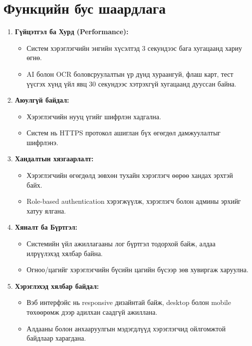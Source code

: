 \section{Функцийн бус шаардлага}
\begin{enumerate}
    \item \textbf{Гүйцэтгэл ба Хурд (Performance):} 
    \begin{itemize}
        \item Систем хэрэглэгчийн энгийн хүсэлтэд 3 секундээс бага хугацаанд хариу өгнө.
        \item AI болон OCR боловсруулалтын үр дүнд хураангуй, флаш карт, тест үүсгэх хүнд үйл явц 30 секундээс хэтрэхгүй хугацаанд дууссан байна.
    \end{itemize}  
    \item \textbf{Аюулгүй байдал:}
    \begin{itemize}
        \item Хэрэглэгчийн нууц үгийг шифрлэн хадгална.
        \item Систем нь HTTPS протокол ашиглан бүх өгөгдөл дамжуулалтыг шифрлэнэ.
    \end{itemize}  
    \item \textbf{Хандалтын хязгаарлалт:} 
    \begin{itemize}
        \item Хэрэглэгчийн өгөгдөлд зөвхөн тухайн хэрэглэгч өөрөө хандах эрхтэй байх.
        \item Role-based authentication хэрэгжүүлж, хэрэглэгч болон админы эрхийг хатуу ялгана.
    \end{itemize}
    \item \textbf{Хяналт ба Бүртгэл:} 
    \begin{itemize}
        \item Системийн үйл ажиллагааны лог бүртгэл тодорхой байж, алдаа илрүүлэхэд хялбар байна.
        \item Огноо/цагийг хэрэглэгчийн бүсийн цагийн бүсээр зөв хувиргаж харуулна.
    \end{itemize}  
    \item \textbf{Хэрэглэхэд хялбар байдал:}
    \begin{itemize}
        \item Вэб интерфэйс нь responsive дизайнтай байж, desktop болон mobile төхөөрөмж дээр адилхан саадгүй ажиллана.
        \item Алдааны болон анхааруулгын мэдэгдлүүд хэрэглэгчид ойлгомжтой байдлаар харагдана.
    \end{itemize}
\end{enumerate}

